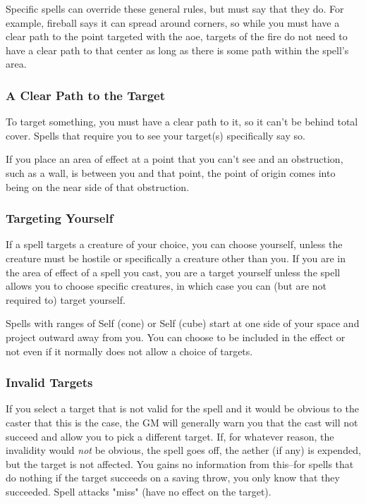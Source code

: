 Specific spells can override these general rules, but must say that they do. For example, fireball says it can spread around corners, so while you must have a clear path to the point targeted with the aoe, targets of the fire do not need to have a clear path to that center as long as there is some path within the spell's area.

\subsubsection{A Clear Path to the Target}

To target something, you must have a clear path to it, so it can't be behind total cover. Spells that require you to see your target(s) specifically say so.

If you place an area of effect at a point that you can't see and an obstruction, such as a wall, is between you and that point, the point of origin comes into being on the near side of that obstruction.

\subsubsection{Targeting Yourself}

If a spell targets a creature of your choice, you can choose yourself, unless the creature must be hostile or specifically a creature other than you. If you are in the area of effect of a spell you cast, you are a target yourself unless the spell allows you to choose specific creatures, in which case you can (but are not required to) target yourself.

Spells with ranges of Self (cone) or Self (cube) start at one side of your space and project outward away from you. You can choose to be included in the effect or not even if it normally does not allow a choice of targets.

\subsubsection{Invalid Targets}\label{sec:invalid-targets}

If you select a target that is not valid for the spell and it would be obvious to the caster that this is the case, the GM will generally warn you that the cast will not succeed and allow you to pick a different target. If, for whatever reason, the invalidity would \textit{not} be obvious, the spell goes off, the aether (if any) is expended, but the target is not affected. You gains no information from this--for spells that do nothing if the target succeeds on a saving throw, you only know that they succeeded. Spell attacks "miss" (have no effect on the target).

